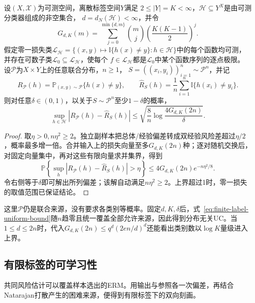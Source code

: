\begingroup
{}
\begin{theorem}[有限标签的一致收敛保证]
\label{thm:finite-label-uniform-convergence}
设$(X,\mathcal X)$为可测空间，离散标签空间$Y$满足
$2\leq|Y|=K<\infty$，$\mathcal H\subseteq Y^X$是由可测分类器组成的非空集合，
$d=d_N(\mathcal H)<\infty$，并令
\[
 G_{d,K}(m)=\sum_{j=0}^{\min\{d,m\}}\binom mj
 \left(\frac{K(K-1)}2\right)^j.
\]
假定零一损失类$\mathcal L_{\mathcal H}
=\{(x,y)\mapsto\mathbb I\{h(x)\neq y\}:h\in\mathcal H\}$中的每个函数均可测，
并存在可数子类$\mathcal L_0\subseteq\mathcal L_{\mathcal H}$，使每个
$f\in\mathcal L_{\mathcal H}$都是$\mathcal L_0$中某个函数序列的逐点极限。
设$\mathcal P$为$X\times Y$上的任意联合分布，$n\geq1$，
$S=((x_i,y_i))_{i=1}^n\sim\mathcal P^n$，并记
\[
 R_{\mathcal P}(h)=\mathbb P_{(x,y)\sim\mathcal P}\{h(x)\neq y\},\qquad
 \hat R_S(h)=\frac1n\sum_{i=1}^n\mathbb I\{h(x_i)\neq y_i\}.
\]
则对任意$\delta\in(0,1)$，以关于$S\sim\mathcal P^n$至少$1-\delta$的概率，
\begin{equation}
 \sup_{h\in\mathcal H}|R_{\mathcal P}(h)-\hat R_S(h)|
 \leq\sqrt{\frac8n\log\frac{4G_{d,K}(2n)}{\delta}}.
 \label{eq:finite-label-uniform-bound}
\end{equation}
\end{theorem}
\endgroup

\begin{proof}
取$\eta>0,n\eta^2\geq2$。独立副样本把总体/经验偏差转成双经验风险差超过$\eta/2$，概率最多增一倍。合并输入上的损失向量至多$G_{d,K}(2n)$种；逐对随机交换后，对固定向量集中，再对这些有限向量求并集界，得到
\[
 \mathbb P\!\left\{\sup_h|R_{\mathcal P}(h)-\hat R_S(h)|>\eta\right\}
 \leq4G_{d,K}(2n)e^{-n\eta^2/8}.
\]
令右侧等于$\delta$即可解出所列偏差；该解自动满足$n\eta^2\geq2$。上界超过1时，零一损失的取值范围已保证结论。
\end{proof}

这里$\mathcal P$仍是联合来源，没有要求各类别等概率。固定$d,K,\delta$后，式~\eqref{eq:finite-label-uniform-bound}随$n$趋零且统一覆盖全部允许来源，因此得到分布无关UC。当$1\leq d\leq2n$时，代入$G_{d,K}(2n)\leq q^d(2en/d)^d$还能看出类别数以$\log K$量级进入上界。

\subsection{有限标签的可学习性}

共同风险估计可以覆盖样本选出的ERM。用输出与参照各一次偏差，再结合Natarajan打散产生的困难来源，便得到有限标签下的双向刻画。


